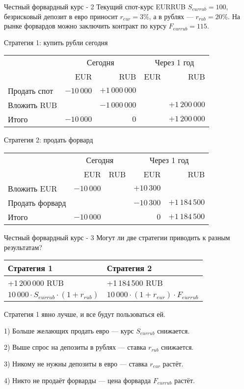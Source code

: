 \documentclass{beamer}
\begin{document}
\begin{frame}{Честный форвардный курс - 2}
\justify
Текущий спот-курс EURRUB $S_{eurrub}=100$, безрисковый депозит в евро 
приносит $r_{eur}=3\%$, а в рублях --- $r_{rub}=20\%$. 
На рынке форвардов можно заключить контракт по курсу $F_{eurrub}=115$.

\justify
Стратегия 1: купить рубли сегодня

\centering
\begin{tabular}{l|r|r|r|r}
& \multicolumn{2}{c|}{Сегодня} & \multicolumn{2}{c}{Через 1 год} \\ \cline{2-5}
& EUR & RUB & EUR & RUB \\ \hline
Продать спот & $-10\,000$ & $+1\,000\,000$ & & \\
Вложить RUB & & $-1\,000\,000$ & & $+1\,200\,000$ \\ \hline
Итого & $-10\,000$ & $0$ & & $+1\,200\,000$
\end{tabular}

\justify
Стратегия 2: продать форвард

\centering
\begin{tabular}{l|r|r|r|r}
& \multicolumn{2}{c|}{Сегодня} & \multicolumn{2}{c}{Через 1 год} \\ \cline{2-5}
& EUR & RUB & EUR & RUB \\ \hline
Вложить EUR & $-10\,000$ & & $+10\,300$ & \\
Продать форвард &   &   & $-10\,300$ & $+1\,184\,500$ \\ \hline
Итого & $-10\,000$ &   & $0$ & $+1\,184\,500$
\end{tabular}
\end{frame}



\begin{frame}{Честный форвардный курс - 3}
\justify
Могут ли две стратегии приводить к разным результатам?

\justify
\centering
\begin{tabular}{l|l}
Стратегия 1 & Стратегия 2 \\ \hline
+1\,200\,000 RUB  & +1\,184\,500 RUB \\
$10\,000 \cdot S_{eurrub} \cdot (1+r_{rub})$ & $10\,000 \cdot (1+r_{eur}) \cdot F_{eurrub}$
\end{tabular}

\justify
Стратегия 1 явно лучше, и все будут пользоваться ей. 

1) Больше желающих продать евро --- курс $S_{eurrub}$ снижается.

2) Выше спрос на депозиты в рублях --- ставка $r_{rub}$ снижается.

3) Никому не нужны депозиты в евро --- ставка $r_{eur}$ растёт. 

4) Никто не продаёт форварды --- цена форварда $F_{eurrub}$ растёт.
\end{frame}
\end{document}
